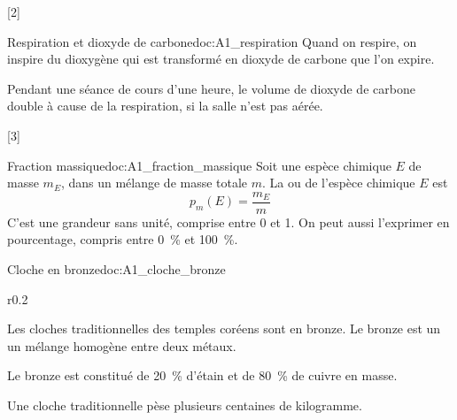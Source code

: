 [2]

\begin{doc}{Respiration et dioxyde de carbone}{doc:A1_respiration}
  Quand on respire, on inspire du dioxygène \dioxygene qui est transformé en dioxyde de carbone \dioxydeDeCarbone que l'on expire.

  Pendant une séance de cours d'une heure, le volume de dioxyde de carbone \dioxydeDeCarbone double à cause de la respiration, si la salle n'est pas aérée.
\end{doc}

[3]


\begin{doc}{Fraction massique}{doc:A1_fraction_massique}
  Soit une espèce chimique $E$ de masse $m_E$, dans un mélange de masse totale $m$.
  La  ou  de l'espèce chimique $E$ est
  \begin{equation*}
    p_{m}(E) = \frac{m_E}{m}
  \end{equation*}
  C'est une grandeur sans unité, comprise entre 0 et 1.
  On peut aussi l'exprimer en pourcentage, compris entre \qty{0}{\percent} et \qty{100}{\percent}.
\end{doc}

\begin{doc}{Cloche en bronze}{doc:A1_cloche_bronze}
  \begin{wrapfigure}[5]{r}{0.2\linewidth}
    \vspace*{-31pt}
    \centering
  \end{wrapfigure}
  
  Les cloches traditionnelles des temples coréens sont en bronze.
  Le bronze est un  un mélange homogène entre deux métaux.
  
  Le bronze est constitué de \qty{20}{\percent} d'étain  et de \qty{80}{\percent} de cuivre  en masse.

  Une cloche traditionnelle pèse plusieurs centaines de kilogramme.
\end{doc}


